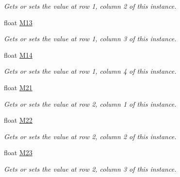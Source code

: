 \begin{DoxyCompactItemize}
\begin{DoxyCompactList}\small\item\em Gets or sets the value at row 1, column 2 of this instance. \end{DoxyCompactList}\item 
float \hyperlink{struct_open_t_k_1_1_matrix2x4_afeadbb3dd16162e2959116d538041130}{M13}
\begin{DoxyCompactList}\small\item\em Gets or sets the value at row 1, column 3 of this instance. \end{DoxyCompactList}\item 
float \hyperlink{struct_open_t_k_1_1_matrix2x4_a5987f9d4b386602286edc35807e855aa}{M14}
\begin{DoxyCompactList}\small\item\em Gets or sets the value at row 1, column 4 of this instance. \end{DoxyCompactList}\item 
float \hyperlink{struct_open_t_k_1_1_matrix2x4_a280ba9bb57a408885c699a2ec1e38357}{M21}
\begin{DoxyCompactList}\small\item\em Gets or sets the value at row 2, column 1 of this instance. \end{DoxyCompactList}\item 
float \hyperlink{struct_open_t_k_1_1_matrix2x4_acaf2e338dad35266c8c61ca9f8bd4695}{M22}
\begin{DoxyCompactList}\small\item\em Gets or sets the value at row 2, column 2 of this instance. \end{DoxyCompactList}\item 
float \hyperlink{struct_open_t_k_1_1_matrix2x4_a0f33e616958bb588e07fe2975eea9db6}{M23}
\begin{DoxyCompactList}\small\item\em Gets or sets the value at row 2, column 3 of this instance. \end{DoxyCompactList}\item 

\end{DoxyCompactItemize}
